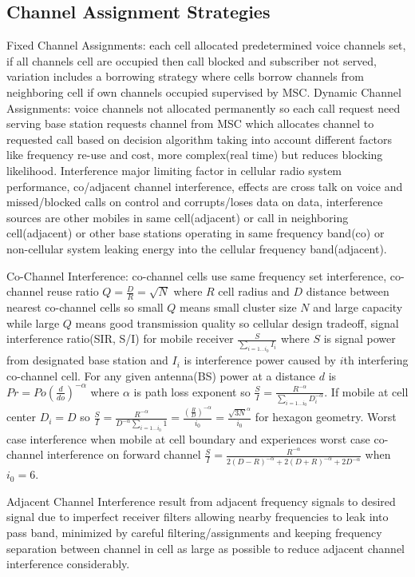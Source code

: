 \documentclass[9pt]{extarticle}
\begin{document}
\begin{multicols}{2}
\subsection{Channel Assignment Strategies}

Fixed Channel Assignments: each cell allocated predetermined voice channels set, if all channels cell are occupied then call blocked and subscriber not served, variation includes a borrowing strategy where cells borrow channels from neighboring cell if own channels occupied supervised by MSC. Dynamic Channel Assignments: voice channels not allocated permanently so each call request need serving base station requests channel from MSC which allocates channel to requested call based on decision algorithm taking into account different factors like frequency re-use and cost, more complex(real time) but reduces blocking likelihood. Interference major limiting factor in cellular radio system performance, co/adjacent channel interference, effects are cross talk on voice and missed/blocked calls on control and corrupts/loses data on data, interference sources are other mobiles in same cell(adjacent) or call in neighboring cell(adjacent) or other base stations operating in same frequency band(co) or non-cellular system leaking energy into the cellular frequency band(adjacent).

Co-Channel Interference: co-channel cells use same frequency set interference, co-channel reuse ratio $Q=\frac{D}{R}=\sqrt{N}$ where $R$  cell radius and $D$ distance between nearest co-channel cells so small $Q$ means small cluster size $N$ and large capacity while large $Q$ means good transmission quality so cellular design tradeoff, signal interference ratio(SIR, S/I) for mobile receiver $\frac{S}{\sum_{i=1\dots{i_0}}I_i}$ where $S$ is signal power from designated base station and $I_i$ is interference power caused by $i$th interfering co-channel cell. For any given antenna(BS) power at a distance $d$ is $Pr=Po(\frac{d}{do})^{-\alpha}$ where $\alpha$ is path loss exponent so $\frac{S}{I}=\frac{R^{-\alpha}}{\sum_{i=1\dots{i_0}}D^{-\alpha}_i}$. If mobile at cell center $D_i=D$ so $\frac{S}{I}=\frac{R^{-\alpha}}{D^{-\alpha}\sum_{i=1\dots{i_0}}1}=\frac{(\frac{R}{D})^{-\alpha}}{i_0}=\frac{\sqrt{3N}^\alpha}{i_0}$ for hexagon geometry. Worst case interference when mobile at cell boundary and experiences worst case co-channel
interference on forward channel $\frac{S}{I}=\frac{R^{-\alpha}}{2(D-R)^{-\alpha}+2(D+R)^{-\alpha}+2D^{-\alpha}}$ when $i_0=6$.

Adjacent Channel Interference result from adjacent frequency signals to desired signal due to imperfect receiver filters allowing nearby frequencies to leak into pass band, minimized by careful filtering/assignments and keeping frequency separation between channel in cell as large as possible to reduce adjacent channel interference considerably.


\end{multicols}
\end{document}
